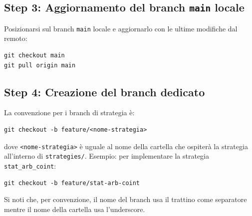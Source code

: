 \subsection{Step 3: Aggiornamento del branch \texttt{main} locale}

Posizionarsi sul branch \texttt{main} locale e aggiornarlo con le ultime modifiche dal remoto:

\begin{lstlisting}
git checkout main
git pull origin main
\end{lstlisting}

\subsection{Step 4: Creazione del branch dedicato}

La convenzione per i branch di strategia è:

\begin{lstlisting}
git checkout -b feature/<nome-strategia>
\end{lstlisting}

dove \texttt{<nome-strategia>} è uguale al nome della cartella che ospiterà la strategia all'interno di \texttt{strategies/}. Esempio: per implementare la strategia \texttt{stat\_arb\_coint}:

\begin{lstlisting}
git checkout -b feature/stat-arb-coint
\end{lstlisting}

Si noti che, per convenzione, il nome del branch usa il trattino come separatore mentre il nome della cartella usa l'underscore.
